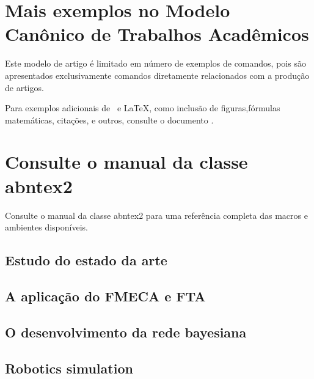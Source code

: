 \section{Mais exemplos no Modelo Canônico de Trabalhos Acadêmicos}

Este modelo de artigo é limitado em número de exemplos de comandos, pois são apresentados exclusivamente comandos diretamente relacionados com a produção de artigos.

Para exemplos adicionais de \abnTeX\ e \LaTeX, como inclusão de figuras,fórmulas matemáticas, citações, e outros, consulte o documento .

\section{Consulte o manual da classe \textsf{abntex2}}

Consulte o manual da classe \textsf{abntex2} \cite{abntex2classe} para uma referência completa das macros e ambientes disponíveis.

\subsection{Estudo do estado da arte}

\subsection{A aplicação do FMECA e FTA}

\subsection{O desenvolvimento da rede bayesiana}

\subsection{Robotics simulation}



